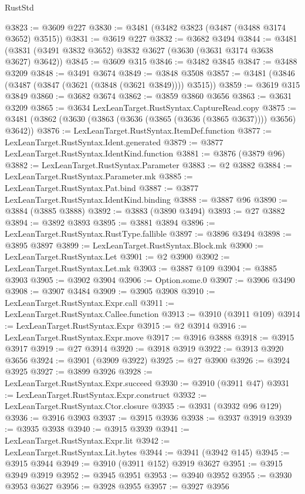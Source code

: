 \begin{lexlean}{RustStd}
\begin{coremodule}
@3823 := @3609 @227
@3830 := @3481 (@3482 @3823 (@3487 (@3488 @3174 @3652) @3515))
@3831 := @3619 @227
@3832 := @3682 @3494
@3844 := @3481 (@3831 (@3491 @3832 @3652) @3832 @3627 (@3630 (@3631 @3174 @3638 @3627) @3642))
@3845 := @3609 @315
@3846 := @3482 @3845
@3847 := @3488 @3209
@3848 := @3491 @3674
@3849 := @3848 @3508
@3857 := @3481 (@3846 (@3487 (@3847 (@3621 (@3848 (@3621 @3849)))) @3515))
@3859 := @3619 @315 @3849
@3860 := @3682 @3674
@3862 := @3859 @3860 @3656
@3863 := @3631 @3209
@3865 := @3634 LexLeanTarget.RustSyntax.CaptureRead.copy
@3875 := @3481 (@3862 (@3630 (@3863 (@3636 (@3865 (@3636 (@3865 @3637)))) @3656) @3642))
@3876 := LexLeanTarget.RustSyntax.ItemDef.function
@3877 := LexLeanTarget.RustSyntax.Ident.generated
@3879 := @3877 LexLeanTarget.RustSyntax.IdentKind.function
@3881 := @3876 (@3879 @96)
@3882 := LexLeanTarget.RustSyntax.Parameter
@3883 := @2 @3882
@3884 := LexLeanTarget.RustSyntax.Parameter.mk
@3885 := LexLeanTarget.RustSyntax.Pat.bind
@3887 := @3877 LexLeanTarget.RustSyntax.IdentKind.binding
@3888 := @3887 @96
@3890 := @3884 (@3885 @3888)
@3892 := @3883 (@3890 @3494)
@3893 := @27 @3882
@3894 := @3892 @3893
@3895 := @3881 @3894
@3896 := LexLeanTarget.RustSyntax.RustType.fallible
@3897 := @3896 @3494
@3898 := @3895 @3897
@3899 := LexLeanTarget.RustSyntax.Block.mk
@3900 := LexLeanTarget.RustSyntax.Let
@3901 := @2 @3900
@3902 := LexLeanTarget.RustSyntax.Let.mk
@3903 := @3887 @109
@3904 := @3885 @3903
@3905 := @3902 @3904
@3906 := Option.some.{0}
@3907 := @3906 @3490
@3908 := @3907 @3484
@3909 := @3905 @3908
@3910 := LexLeanTarget.RustSyntax.Expr.call
@3911 := LexLeanTarget.RustSyntax.Callee.function
@3913 := @3910 (@3911 @109)
@3914 := LexLeanTarget.RustSyntax.Expr
@3915 := @2 @3914
@3916 := LexLeanTarget.RustSyntax.Expr.move
@3917 := @3916 @3888
@3918 := @3915 @3917
@3919 := @27 @3914
@3920 := @3918 @3919
@3922 := @3913 @3920 @3656
@3924 := @3901 (@3909 @3922)
@3925 := @27 @3900
@3926 := @3924 @3925
@3927 := @3899 @3926
@3928 := LexLeanTarget.RustSyntax.Expr.succeed
@3930 := @3910 (@3911 @47)
@3931 := LexLeanTarget.RustSyntax.Expr.construct
@3932 := LexLeanTarget.RustSyntax.Ctor.closure
@3935 := @3931 (@3932 @96 @129)
@3936 := @3916 @3903
@3937 := @3915 @3936
@3938 := @3937 @3919
@3939 := @3935 @3938
@3940 := @3915 @3939
@3941 := LexLeanTarget.RustSyntax.Expr.lit
@3942 := LexLeanTarget.RustSyntax.Lit.bytes
@3944 := @3941 (@3942 @145)
@3945 := @3915 @3944
@3949 := @3910 (@3911 @152) @3919 @3627
@3951 := @3915 @3949 @3919
@3952 := @3945 @3951
@3953 := @3940 @3952
@3955 := @3930 @3953 @3627
@3956 := @3928 @3955
@3957 := @3927 @3956

\end{coremodule}
\end{lexlean}
